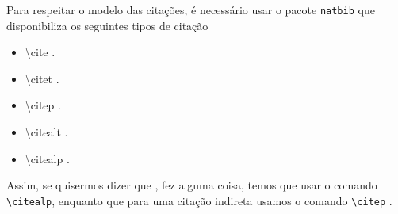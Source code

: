 \documentclass{automatex}
\begin{document}
Para respeitar o modelo das citações, é necessário usar o pacote {\tt natbib} que disponibiliza
os seguintes tipos de citação
\begin{itemize}
  \item \textbackslash{cite} \cite{small}.
  \item \textbackslash{citet} \citet{small}.
  \item \textbackslash{citep} \citep{small}.
  \item \textbackslash{citealt} \citealt{small}.
  \item \textbackslash{citealp} \citealp{small}.
\end{itemize}

Assim, se quisermos dizer que \citealp{big}, fez alguma coisa, temos que usar o comando {\tt \textbackslash{citealp}},
enquanto que para uma citação indireta usamos o comando {\tt \textbackslash{citep}} \citep{big}.


\end{document}
